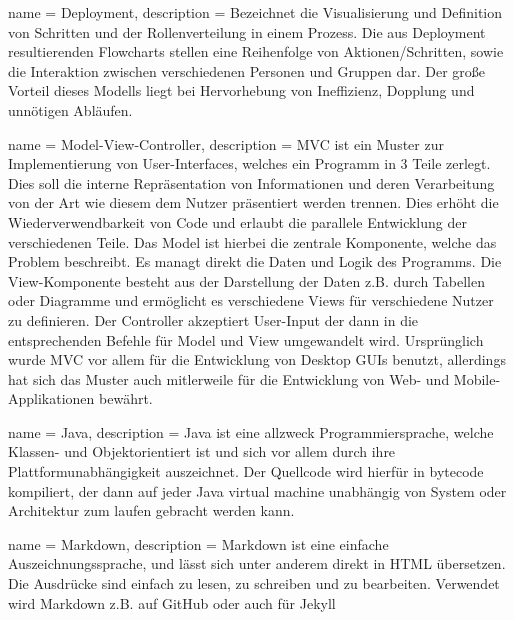      {
        name = Deployment,
        description = {
            Bezeichnet die Visualisierung und Definition von Schritten und der 
            Rollenverteilung in einem Prozess. Die aus Deployment resultierenden 
            Flowcharts stellen eine Reihenfolge von Aktionen/Schritten, sowie die 
            Interaktion zwischen verschiedenen Personen und Gruppen dar. Der große Vorteil 
            dieses Modells liegt bei Hervorhebung von Ineffizienz, Dopplung und unnötigen
            Abläufen.
        }
    }


     {
        name = Model-View-Controller,
        description = {
            MVC ist ein Muster zur Implementierung von User-Interfaces, welches ein 
            Programm in 3 Teile zerlegt. Dies soll die interne Repräsentation von 
            Informationen und deren Verarbeitung von der Art wie diesem dem Nutzer 
            präsentiert werden trennen. Dies erhöht die Wiederverwendbarkeit
            von Code und erlaubt die parallele Entwicklung der verschiedenen Teile. Das 
            Model ist hierbei die zentrale Komponente, welche das Problem beschreibt. Es 
            managt direkt die Daten und Logik des Programms. Die View-Komponente besteht 
            aus der Darstellung der Daten z.B. durch Tabellen oder Diagramme und 
            ermöglicht es verschiedene Views für verschiedene Nutzer zu definieren.
            Der Controller akzeptiert User-Input der dann in die entsprechenden Befehle 
            für Model und View umgewandelt wird. Ursprünglich wurde MVC vor allem für die 
            Entwicklung von Desktop GUIs benutzt, allerdings hat sich das Muster auch 
            mitlerweile für die Entwicklung von Web- und Mobile- Applikationen bewährt.
        }
    }


     {
        name = Java,
        description = {
            Java ist eine allzweck Programmiersprache, welche Klassen- und 
            Objektorientiert ist und sich vor allem durch ihre Plattformunabhängigkeit 
            auszeichnet. Der Quellcode wird hierfür in bytecode kompiliert, der dann auf 
            jeder Java virtual machine unabhängig von System oder Architektur zum laufen 
            gebracht werden kann.
        }
    }


     {
        name = Markdown,
        description = {
            Markdown ist eine einfache Auszeichnungssprache, und lässt sich unter anderem 
            direkt in HTML übersetzen. Die Ausdrücke sind einfach zu lesen, zu schreiben 
            und zu bearbeiten. 
            Verwendet wird Markdown z.B. auf GitHub oder auch für Jekyll
        }
    }


